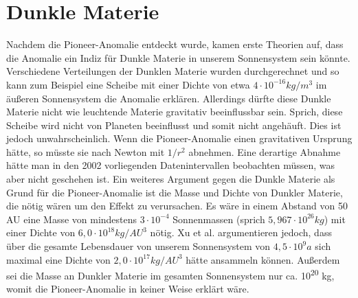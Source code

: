 \section{ Dunkle Materie}\label{Dm}

Nachdem die Pioneer-Anomalie entdeckt wurde, kamen erste Theorien auf,
dass die Anomalie ein Indiz f\"ur Dunkle Materie in unserem
Sonnensystem sein k\"onnte. Verschiedene Verteilungen der Dunklen
Materie wurden durchgerechnet und so kann zum Beispiel eine Scheibe mit
einer Dichte von etwa $4\cdot 10^{-16}\mathit{kg}/m^{3}$ im
\"au{\ss}eren Sonnensystem die Anomalie erkl\"aren. Allerdings d\"urfte
diese Dunkle Materie nicht wie leuchtende Materie gravitativ
beeinflussbar sein\cite{Turyshev2010}. Sprich, diese Scheibe wird nicht
von Planeten beeinflusst und somit nicht angeh\"auft. Dies ist jedoch
unwahrscheinlich. Wenn die Pioneer-Anomalie einen gravitativen Ursprung
h\"atte, so m\"usste sie nach Newton mit $1/r^{2}$ abnehmen. Eine
derartige Abnahme h\"atte man in den 2002 vorliegenden Datenintervallen
beobachten m\"ussen, was aber nicht geschehen ist. Ein weiteres
Argument gegen die Dunkle Materie als Grund f\"ur die Pioneer-Anomalie
ist die Masse und Dichte von Dunkler Materie, die n\"otig w\"aren um
den Effekt zu verursachen. Es w\"are in einem Abstand von 50 AU eine
Masse von mindestens $3\cdot 10^{-4}$ Sonnenmassen (sprich
$5,967\cdot 10^{26}\mathit{kg}$) mit einer Dichte von $6,0\cdot
10^{18}\mathit{kg}/\mathit{AU}^{3}$ n\"otig. Xu et al. \cite{Xu2008} argumentieren jedoch, dass \"uber die gesamte Lebensdauer
von unserem Sonnensystem von $4,5\cdot 10^{9}a$ sich maximal eine Dichte von
$2,0\cdot 10^{17}\mathit{kg}/\mathit{AU}^{3}$ h\"atte ansammeln
k\"onnen. Au{\ss}erdem sei die Masse an Dunkler Materie im gesamten
Sonnensystem nur ca. {}10\textsuperscript{20 }kg, womit die
Pioneer-Anomalie in keiner Weise erkl\"art w\"are.


